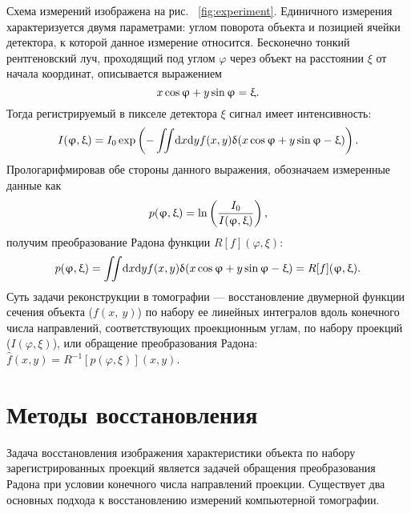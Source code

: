 Схема измерений изображена на рис. ~\ref{fig:experiment}.
Единичного измерения характеризуется двумя параметрами: углом поворота объекта и позицией ячейки детектора, к которой данное измерение относится.
Бесконечно тонкий рентгеновский луч, проходящий под углом $\varphi$  через объект на расстоянии $\xi$  от начала координат, описывается выражением
\begin{equation}\notag
  x\cos\varphi + y\sin\varphi = \xi.
\end{equation}
Тогда регистрируемый в пикселе детектора $\xi$ сигнал имеет интенсивность:
\begin{equation}\notag
  I(\varphi, \xi) = I_0 \exp\left( {-\iint \! \mathrm d x \mathrm d y f(x,y)\delta(x\cos\varphi + y\sin\varphi - \xi)}\right).
\end{equation}
Прологарифмировав обе стороны данного выражения, обозначаем измеренные данные как
\begin{equation}\notag
  p(\varphi, \xi) = \ln \left (\frac{I_0}{I(\varphi, \xi)} \right),
\end{equation}
получим преобразование Радона функции $R[f](\varphi, \xi)$:
\begin{equation}\notag
  p(\varphi, \xi)= \iint \! \mathrm d x \mathrm d y f(x,y)\delta(x\cos\varphi + y\sin\varphi - \xi) = R[f](\varphi, \xi).
\end{equation}
Суть задачи реконструкции в томографии --- восстановление двумерной функции сечения объекта ($f(x,\ y)$) по набору ее линейных интегралов вдоль конечного числа направлений, соответствующих проекционным углам, по набору проекций ($I(\varphi, \xi)$), или обращение преобразования Радона: $\hat{f}(x, y) = R^{-1}[p(\varphi, \xi)](x, y)$.

\section{Методы восстановления}
Задача восстановления изображения характеристики объекта по набору зарегистрированных проекций является задачей обращения преобразования Радона при условии конечного числа направлений проекции.
Существует два основных подхода к восстановлению измерений компьютерной томографии.

